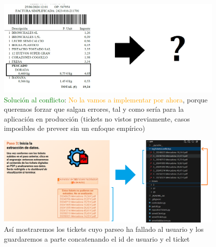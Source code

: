 \documentclass{beamer}
\begin{document}
	
	\begin{frame}
		\begin{figure}
			\centering
			\includegraphics[width=1\linewidth]{imgEspecifiques/ticketExtraccioS}
			\caption{\textcolor{green}{Solución al conflicto}: \textcolor{orange}{No la vamos a implementar por ahora}, porque queremos forzar que salgan errores, tal y como sería para la aplicación en producción (tickets no vistos previamente, casos imposibles de preveer sin un enfoque empírico)}
			\label{fig:ticketextraccioS}
		\end{figure}
	\end{frame}
	
	\begin{frame}
		
		\begin{figure}
			\centering
			\includegraphics[width=1\linewidth]{imgEspecifiques/mostraErrorsPas4_i_maneig}
			\caption{Así mostraremos los tickets cuyo parseo ha fallado al usuario y los guardaremos a parte concatenando el id de usuario y el ticket}
			\label{fig:mostraerrorspas4imaneig}
		\end{figure}
		
	\end{frame}
	
\end{document}
